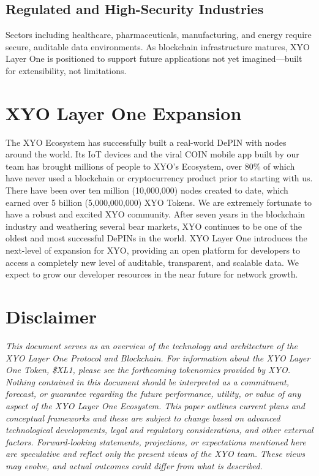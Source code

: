 \documentclass{article}
\begin{document}
\subsection{Regulated and High-Security Industries}
Sectors including healthcare, pharmaceuticals, manufacturing, and energy require secure, auditable data environments.
As blockchain infrastructure matures, XYO Layer One is positioned to support future applications not yet imagined—built for extensibility, not limitations.

\section{XYO Layer One Expansion}
The XYO Ecosystem has successfully built a real-world DePIN with nodes around the world. Its IoT devices and the viral COIN mobile app built by our team has brought millions of people to XYO's Ecosystem, over 80\% of which have never used a blockchain or cryptocurrency product prior to starting with us. There have been over ten million (10,000,000) nodes created to date, which earned over 5 billion (5,000,000,000) XYO Tokens. We are extremely fortunate to have a robust and excited XYO community. After seven years in the blockchain industry and weathering several bear markets, XYO continues to be one of the oldest and most successful DePINs in the world. XYO Layer One introduces the next-level of expansion for XYO, providing an open platform for developers to access a completely new level of auditable, transparent, and scalable data. We expect to grow our developer resources in the near future for network growth.

\newpage
\section*{Disclaimer}
\textit{This document serves as an overview of the technology and architecture of the XYO Layer One Protocol and Blockchain. For information about the XYO Layer One Token, \$XL1, please see the forthcoming tokenomics provided by XYO.
Nothing contained in this document should be interpreted as a commitment, forecast, or guarantee regarding the future performance, utility, or value of any aspect of the XYO Layer One Ecosystem. This paper outlines current plans and conceptual frameworks and these are subject to change based on advanced technological developments, legal and regulatory considerations, and other external factors. Forward-looking statements, projections, or expectations mentioned here are speculative and reflect only the present views of the XYO team. These views may evolve, and actual outcomes could differ from what is described.}
\end{document}
